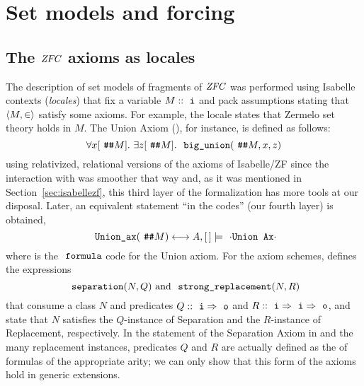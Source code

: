\section{Set models and forcing}
\label{sec:forcing}

\subsection{The $\mathit{ZFC}$ axioms as locales}
The description of set models of fragments of $\mathit{ZFC}$ was performed
using Isabelle contexts (\emph{locales}) that fix a variable $M::\tyi$
and pack assumptions stating that $\langle M, \in\rangle$ satisfy some
axioms. For example, the locale 
states that Zermelo set theory holds in $M$. The Union Axiom (), for
instance, is defined as follows:
\[
\forall x[\isatt{\#\#}M].\ \exists z[\isatt{\#\#}M].\ \isatt{big{\uscore}union}(\isatt{\#\#}M,x,z)
\]
using relativized, relational versions of the axioms of Isabelle/ZF
since the interaction with  was smoother
that way and, as it was mentioned in Section~\ref{sec:isabellezf},
this third layer of the formalization has more tools at our
disposal. Later, an equivalent statement “in the codes” (our fourth
layer) is obtained,
\[
  \isatt{Union{\uscore}ax}(\isatt{\#\#}M) \lsii A, [\,]\models \isatt{{\isasymcdot}Union\ Ax{\isasymcdot}}
\]
where  is the $\formula$ code for the
Union axiom. For the axiom schemes,  defines
the expressions
\[
  \isatt{separation}(N,Q)
  \text{ and }
  \isatt{strong{\uscore}replacement}(N,R)
\]
that consume a class $N$ and predicates $Q::\tyi\fun\tyo$ and $R::\tyi\fun\tyi\fun\tyo$, and state that $N$
satisfies the $Q$-instance of Separation and the $R$-instance of
Replacement, respectively. In the statement of the Separation Axiom in
 and
the many replacement instances, predicates $Q$ and $R$ are actually
defined as the of formulas of the appropriate arity; we can only show
that this form of the axioms hold in generic extensions. 

